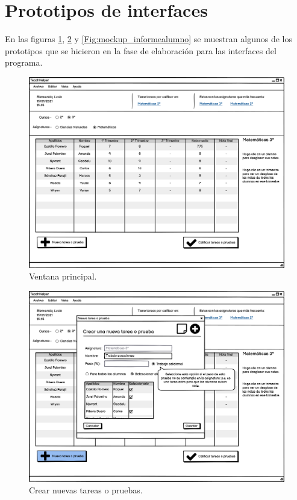 	
\section{Prototipos de interfaces}
En las figuras \ref{Fig:mockup_mainwindow}, \ref{Fig:mockup_nuevatarea} y \ref{Fig:mockup_informealumno} se muestran algunos de los prototipos que se hicieron en la fase de elaboración para las interfaces del programa.

\begin{figure}[h]
\centering\includegraphics[width=1\linewidth]{figs/mockup_mainwindow.png}
\caption{Ventana principal.}
\label{Fig:mockup_mainwindow}
\end{figure}

\begin{figure}[h]
\centering\includegraphics[width=1\linewidth]{figs/mockup_nuevatarea.png}
\caption{Crear nuevas tareas o pruebas.}
\label{Fig:mockup_nuevatarea}
\end{figure}

